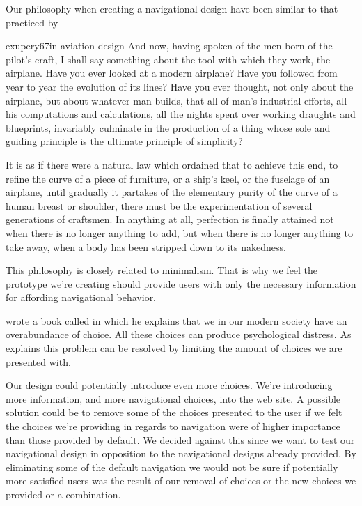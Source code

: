 Our philosophy when creating a navigational design have been
similar to that practiced by
\begin{fullquotation}[\chap{3}]{exupery67}{in aviation design}
  \noindent
  And now, having spoken of the men born of the pilot's craft, I shall say
  something about the tool with which they work, the airplane. Have you
  ever looked at a modern airplane? Have you followed from year to year
  the evolution of its lines? Have you ever thought, not only about the
  airplane, but about whatever man builds, that all of man's industrial
  efforts, all his computations and calculations, all the nights spent
  over working draughts and blueprints, invariably culminate in the
  production of a thing whose sole and guiding principle is the ultimate
  principle of simplicity?

  It is as if there were a natural law which ordained that to achieve this
  end, to refine the curve of a piece of furniture, or a ship's keel, or
  the fuselage of an airplane, until gradually it partakes of the
  elementary purity of the curve of a human breast or shoulder, there must
  be the experimentation of several generations of craftsmen. In anything
  at all, perfection is finally attained not when there is no longer
  anything to add, but when there is no longer anything to take away,
  when a body has been stripped down to its nakedness.
\end{fullquotation}

This philosophy is closely related to minimalism.%
That is why we feel the prototype we're creating should provide users
with only the necessary information for affording navigational behavior.

\citet{schwartz04} wrote a book called
 in which he explains that
we in our modern society have an overabundance of choice. All these choices
can produce psychological distress. As \citeauthor{schwartz04} explains this
problem can be resolved by limiting the amount of choices we are presented
with.

Our design could potentially introduce even more choices. We're
introducing more information, and more navigational choices, into the
\urort{} web site. A possible solution could be to remove some of the
choices presented to the user if we felt the choices we're providing in
regards to navigation were of higher importance than those provided by
default. We decided against this since we want to test our navigational
design in opposition to the navigational designs already provided. By
eliminating some of the default navigation we would not be sure
if potentially more satisfied users was the result of our removal of
choices or the new choices we provided or a combination.

